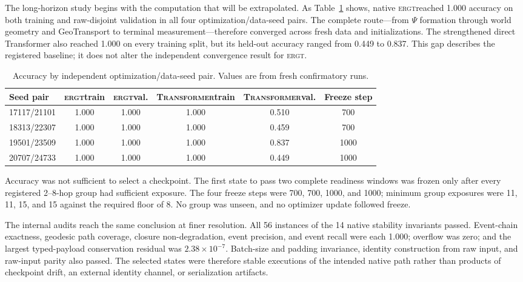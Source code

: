 \documentclass[11pt]{article}
\newcommand{\ERGT}{\textsc{ergt}}
\newcommand{\TF}{\textsc{Transformer}}
\begin{document}
The long-horizon study begins with the computation that will be extrapolated.
As Table~\ref{tab:convergence} shows, native \ERGT reached 1.000 accuracy on
both training and raw-disjoint validation in all four optimization/data-seed
pairs. The complete route---from $\Psi$ formation through world geometry and
GeoTransport to terminal measurement---therefore converged across fresh data
and initializations. The strengthened direct Transformer also reached 1.000 on
every training split, but its held-out accuracy ranged from 0.449 to 0.837.
This gap describes the registered baseline; it does not alter the independent
convergence result for \ERGT.

\begin{table}[t]
\centering
\caption{Accuracy by independent optimization/data-seed pair. Values are
from fresh confirmatory runs.}
\label{tab:convergence}
\small
\begin{tabular}{@{}lccccc@{}}
\toprule
Seed pair & \ERGT train & \ERGT val. & \TF train & \TF val. & Freeze step \\
\midrule
17117/21101 & 1.000 & 1.000 & 1.000 & 0.510 & 700 \\
18313/22307 & 1.000 & 1.000 & 1.000 & 0.459 & 700 \\
19501/23509 & 1.000 & 1.000 & 1.000 & 0.837 & 1000 \\
20707/24733 & 1.000 & 1.000 & 1.000 & 0.449 & 1000 \\
\bottomrule
\end{tabular}
\end{table}

Accuracy was not sufficient to select a checkpoint. The first state to pass two
complete readiness windows was frozen only after every registered 2--8-hop
group had sufficient exposure. The four freeze steps were 700, 700, 1000, and
1000; minimum group exposures were 11, 11, 15, and 15 against the required
floor of 8. No group was unseen, and no optimizer update followed freeze.

The internal audits reach the same conclusion at finer resolution. All 56
instances of the 14 native stability invariants passed. Event-chain exactness,
geodesic path coverage, closure non-degradation, event precision, and event
recall were each 1.000; overflow was zero; and the largest typed-payload
conservation residual was $2.38\times10^{-7}$. Batch-size and padding
invariance, identity construction from raw input, and raw-input parity also
passed. The selected states were therefore stable executions of the intended
native path rather than products of checkpoint drift, an external identity
channel, or serialization artifacts.
\end{document}
